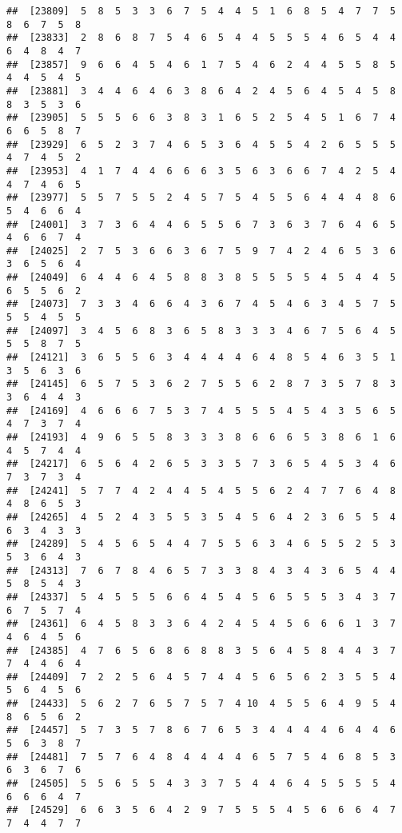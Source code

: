 \documentclass[
]{book}
\begin{document}
\begin{verbatim}
##  [23809]  5  8  5  3  3  6  7  5  4  4  5  1  6  8  5  4  7  7  5  8  6  7  5  8
##  [23833]  2  8  6  8  7  5  4  6  5  4  4  5  5  5  4  6  5  4  4  6  4  8  4  7
##  [23857]  9  6  6  4  5  4  6  1  7  5  4  6  2  4  4  5  5  8  5  4  4  5  4  5
##  [23881]  3  4  4  6  4  6  3  8  6  4  2  4  5  6  4  5  4  5  8  8  3  5  3  6
##  [23905]  5  5  5  6  6  3  8  3  1  6  5  2  5  4  5  1  6  7  4  6  6  5  8  7
##  [23929]  6  5  2  3  7  4  6  5  3  6  4  5  5  4  2  6  5  5  5  4  7  4  5  2
##  [23953]  4  1  7  4  4  6  6  6  3  5  6  3  6  6  7  4  2  5  4  4  7  4  6  5
##  [23977]  5  5  7  5  5  2  4  5  7  5  4  5  5  6  4  4  4  8  6  5  4  6  6  4
##  [24001]  3  7  3  6  4  4  6  5  5  6  7  3  6  3  7  6  4  6  5  4  6  6  7  4
##  [24025]  2  7  5  3  6  6  3  6  7  5  9  7  4  2  4  6  5  3  6  3  6  5  6  4
##  [24049]  6  4  4  6  4  5  8  8  3  8  5  5  5  5  4  5  4  4  5  6  5  5  6  2
##  [24073]  7  3  3  4  6  6  4  3  6  7  4  5  4  6  3  4  5  7  5  5  5  4  5  5
##  [24097]  3  4  5  6  8  3  6  5  8  3  3  3  4  6  7  5  6  4  5  5  5  8  7  5
##  [24121]  3  6  5  5  6  3  4  4  4  4  6  4  8  5  4  6  3  5  1  3  5  6  3  6
##  [24145]  6  5  7  5  3  6  2  7  5  5  6  2  8  7  3  5  7  8  3  3  6  4  4  3
##  [24169]  4  6  6  6  7  5  3  7  4  5  5  5  4  5  4  3  5  6  5  4  7  3  7  4
##  [24193]  4  9  6  5  5  8  3  3  3  8  6  6  6  5  3  8  6  1  6  4  5  7  4  4
##  [24217]  6  5  6  4  2  6  5  3  3  5  7  3  6  5  4  5  3  4  6  7  3  7  3  4
##  [24241]  5  7  7  4  2  4  4  5  4  5  5  6  2  4  7  7  6  4  8  4  8  6  5  3
##  [24265]  4  5  2  4  3  5  5  3  5  4  5  6  4  2  3  6  5  5  4  6  3  4  3  3
##  [24289]  5  4  5  6  5  4  4  7  5  5  6  3  4  6  5  5  2  5  3  5  3  6  4  3
##  [24313]  7  6  7  8  4  6  5  7  3  3  8  4  3  4  3  6  5  4  4  5  8  5  4  3
##  [24337]  5  4  5  5  5  6  6  4  5  4  5  6  5  5  5  3  4  3  7  6  7  5  7  4
##  [24361]  6  4  5  8  3  3  6  4  2  4  5  4  5  6  6  6  1  3  7  4  6  4  5  6
##  [24385]  4  7  6  5  6  8  6  8  8  3  5  6  4  5  8  4  4  3  7  7  4  4  6  4
##  [24409]  7  2  2  5  6  4  5  7  4  4  5  6  5  6  2  3  5  5  4  5  6  4  5  6
##  [24433]  5  6  2  7  6  5  7  5  7  4 10  4  5  5  6  4  9  5  4  8  6  5  6  2
##  [24457]  5  7  3  5  7  8  6  7  6  5  3  4  4  4  4  6  4  4  6  5  6  3  8  7
##  [24481]  7  5  7  6  4  8  4  4  4  4  6  5  7  5  4  6  8  5  3  6  3  6  7  6
##  [24505]  5  5  6  5  5  4  3  3  7  5  4  4  6  4  5  5  5  5  4  6  6  6  4  7
##  [24529]  6  6  3  5  6  4  2  9  7  5  5  5  4  5  6  6  6  4  7  7  4  4  7  7

\end{verbatim}
\end{document}
